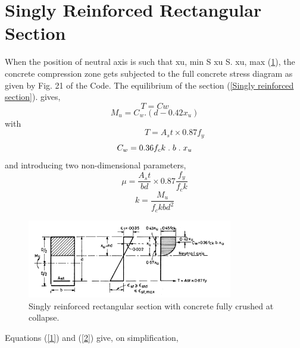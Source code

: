 \section{Singly Reinforced Rectangular Section}
When the position of neutral axis is such that xu, min S xu S. xu, max (\fig \ref{Singly reinforced section 1}), the concrete
compression zone gets subjected to the full concrete stress diagram as given by Fig. 21 of the
Code. The equilibrium of the section (\fig \ref{Singly reinforced section}). gives,
\begin{equation}
T=Cw
\label{1}
\end{equation}
\begin{equation}
M_u=C_w.(d-0.42x_u)
\label{2}
\end{equation}
with
\begin{equation*}
\hspace{2cm} T=A_st \times 0.87f_y
\label{3}
\end{equation*}
\begin{equation*}
C_w=0.36f_ck\hspace{0.1cm}.\hspace{0.1cm} b\hspace{0.1cm} .\hspace{0.1cm} x_u
\label{4}
\end{equation*}
and introducing two non-dimensional parameters,
\begin{equation*}
\mu=\frac {A_st}{bd} \times 0.87\frac {f_y}{f_ck}
\label{5}
\end{equation*}
\begin{equation*}
k=\frac{M_u}{f_ckbd^2}
\label{6}
\end{equation*}
\begin{figure}
\centering
\includegraphics[width=0.8\textwidth]{images/ch2-1.png}
\caption{Singly reinforced rectangular section with concrete fully crushed at collapse.}
\label{Singly reinforced section 1}
\end{figure}
\newpage
Equations \eqn (\ref{1})  and \eqn (\ref{2})  give, on simplification,
